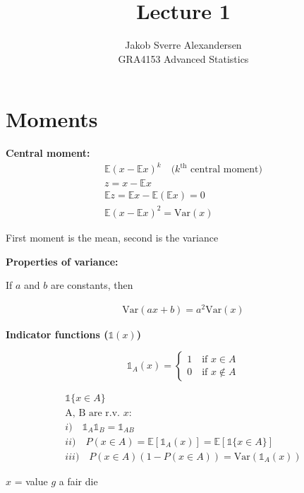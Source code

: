 \documentclass[10pt]{article}
\begin{document}
 
\title{Lecture 1}
\author{Jakob Sverre Alexandersen\\
GRA4153 Advanced Statistics}
\maketitle

\tableofcontents
\newpage

\section{Moments}

\textbf{Central moment:}
\begin{align*}
    \mathbb{E}(x-\mathbb{E}x)^k \quad\text{($k^{\text{th}}$ central moment)}\\
    z = x - \mathbb{E}x \\
    \mathbb{E}z = \mathbb{E}x - \mathbb{E}(\mathbb{E}x) = 0 \\
    \mathbb{E}(x - \mathbb{E}x)^2 = \text{Var} (x)
\end{align*}

First moment is the mean, second is the variance 

\hfill

\textbf{Properties of variance:}

If $a$ and $b$ are constants, then 

\begin{align*}
    \text{Var}(ax + b) = a^2 \text{Var}(x)
\end{align*}

\textbf{Indicator functions ($\mathbb{1}(x)$)}

\[
\mathbb{1}_A(x) = 
\begin{cases}
    1 \quad\text{if } x \in A \\
    0 \quad\text{if } x \notin A
\end{cases}
\]

\begin{align*}
    \mathbb{1} \{x \in A\} \\
    \text{A, B are r.v. }x: \\
    i) \quad \mathbb{1}_A \mathbb{1}_B = \mathbb{1}_{AB} \\
    ii) \quad P(x \in A) = \mathbb{E}[\mathbb{1}_A(x)] = \mathbb{E}[\mathbb{1}\{x \in A\}] \\
    iii) \quad P(x \in A)(1 - P(x \in A)) = \text{Var}(\mathbb{1}_A(x))
\end{align*}

$x$ = value $g$ a fair die 
\end{document}
